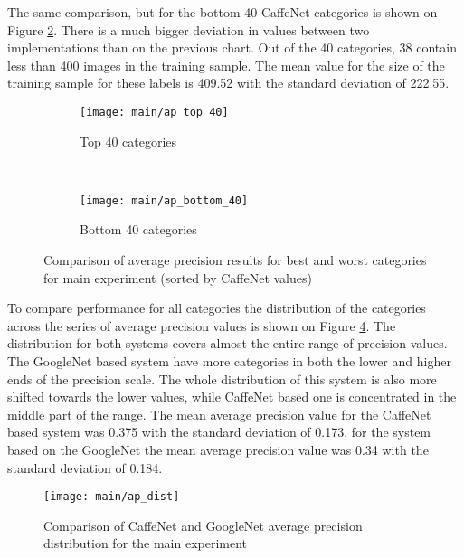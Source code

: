     The same comparison, but for the bottom 40 CaffeNet categories is shown on Figure \ref{fig:main-ap-bottom-40}. There is a much bigger deviation in values between two implementations than on the previous chart. Out of the 40 categories, 38 contain less than 400 images in the training sample. The mean value for the size of the training sample for these labels is 409.52 with the standard deviation of 222.55.  %
    
    
    \begin{figure}[H]
        \centering
        \begin{subfigure}[a]{0.95\textwidth}
            \texttt{[image: main/ap\_top\_40]}
            \caption{Top 40 categories}
            \label{fig:main-ap-top-40}
        \end{subfigure}
        \\
        \begin{subfigure}[a]{0.95\textwidth}
            \texttt{[image: main/ap\_bottom\_40]}
            \caption{Bottom 40 categories}
            \label{fig:main-ap-bottom-40}
        \end{subfigure}
        \caption[Main experiment. Average precision CaffeNet vs GoogleNet]{Comparison of average precision results for best and worst categories for main experiment (sorted by CaffeNet values)}
        \label{fig:main-ap}
    \end{figure}
    
    To compare performance for all categories the distribution of the categories across the series of average precision values is shown on Figure \ref{fig:main-ap-dist}. The distribution for both systems covers almost the entire range of precision values. The GoogleNet based system have more categories in both the lower and higher ends of the precision scale. The whole distribution of this system is also more shifted towards the lower values, while CaffeNet based one is concentrated in the middle part of the range. The mean average precision value for the CaffeNet based system was 0.375 with the standard deviation of 0.173, for the system based on the GoogleNet the mean average precision value was 0.34 with the standard deviation of 0.184.
    
    \begin{figure}[H]
        \centering
        \texttt{[image: main/ap\_dist]}
        \caption[Main experiment. Average precision distribution CaffeNet vs GoogleNet]{Comparison of CaffeNet and GoogleNet average precision distribution for the main experiment}
        \label{fig:main-ap-dist}
    \end{figure}
    
